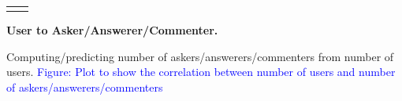 \begin{table}[h!]
\begin{tabular}{m{}c}
\begin{minipage}{.17\textwidth}
    \end{minipage}
    \\
  \end{tabular}
  \vspace{-\baselineskip}
  \label{tab:interaction}
\end{table}

\textbf{User to Asker/Answerer/Commenter.} 


Computing/predicting number of askers/answerers/commenters from number of users. \textcolor{blue}{Figure: Plot to show the correlation between number of users and number of askers/answerers/commenters}



